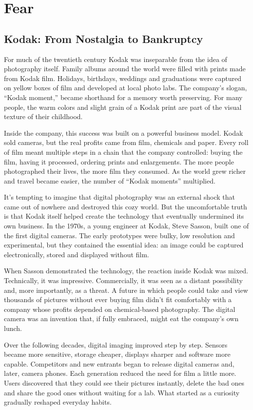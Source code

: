 \chapter{Fear}

\section{Kodak: From Nostalgia to Bankruptcy}

For much of the twentieth century Kodak was inseparable from the idea of photography itself. Family albums around the world were filled with prints made from Kodak film. Holidays, birthdays, weddings and graduations were captured on yellow boxes of film and developed at local photo labs. The company's slogan, ``Kodak moment,'' became shorthand for a memory worth preserving. For many people, the warm colors and slight grain of a Kodak print are part of the visual texture of their childhood.

Inside the company, this success was built on a powerful business model. Kodak sold cameras, but the real profits came from film, chemicals and paper. Every roll of film meant multiple steps in a chain that the company controlled: buying the film, having it processed, ordering prints and enlargements. The more people photographed their lives, the more film they consumed. As the world grew richer and travel became easier, the number of ``Kodak moments'' multiplied.

It's tempting to imagine that digital photography was an external shock that came out of nowhere and destroyed this cozy world. But the uncomfortable truth is that Kodak itself helped create the technology that eventually undermined its own business. In the 1970s, a young engineer at Kodak, Steve Sasson, built one of the first digital cameras. The early prototypes were bulky, low resolution and experimental, but they contained the essential idea: an image could be captured electronically, stored and displayed without film.

When Sasson demonstrated the technology, the reaction inside Kodak was mixed. Technically, it was impressive. Commercially, it was seen as a distant possibility and, more importantly, as a threat. A future in which people could take and view thousands of pictures without ever buying film didn't fit comfortably with a company whose profits depended on chemical-based photography. The digital camera was an invention that, if fully embraced, might eat the company's own lunch.

Over the following decades, digital imaging improved step by step. Sensors became more sensitive, storage cheaper, displays sharper and software more capable. Competitors and new entrants began to release digital cameras and, later, camera phones. Each generation reduced the need for film a little more. Users discovered that they could see their pictures instantly, delete the bad ones and share the good ones without waiting for a lab. What started as a curiosity gradually reshaped everyday habits.

